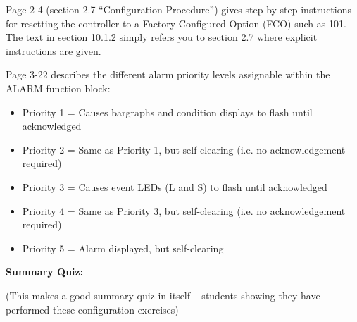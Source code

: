 \vskip 10pt

Page 2-4 (section 2.7 ``Configuration Procedure'') gives step-by-step instructions for resetting the controller to a Factory Configured Option (FCO) such as 101.  The text in section 10.1.2 simply refers you to section 2.7 where explicit instructions are given.

\vskip 10pt

Page 3-22 describes the different alarm priority levels assignable within the ALARM function block:

\begin{itemize}
\item{} Priority 1 = Causes bargraphs and condition displays to flash until acknowledged
\item{} Priority 2 = Same as Priority 1, but self-clearing (i.e. no acknowledgement required)
\item{} Priority 3 = Causes event LEDs (L and S) to flash until acknowledged
\item{} Priority 4 = Same as Priority 3, but self-clearing (i.e. no acknowledgement required)
\item{} Priority 5 = Alarm displayed, but self-clearing
\end{itemize}





















\vfil \eject

\noindent
{\bf Summary Quiz:}

(This makes a good summary quiz in itself -- students showing they have performed these configuration exercises)




